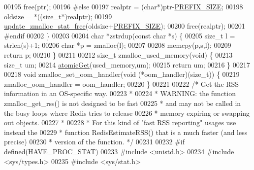 \begin{DoxyCode}
{00195     free(ptr);
00196 \textcolor{preprocessor}{#}\textcolor{preprocessor}{else}
00197     realptr = (\textcolor{keywordtype}{char}*)ptr-\hyperlink{zmalloc_8c_abe208177340b58cb5096daabe07922d1}{PREFIX\_SIZE};
00198     oldsize = *((size\_t*)realptr);
00199     \hyperlink{zmalloc_8c_a9be7d44298f111e7d7f69abb0b41f391}{update\_zmalloc\_stat\_free}(oldsize+\hyperlink{zmalloc_8c_abe208177340b58cb5096daabe07922d1}{PREFIX\_SIZE});
00200     free(realptr);
00201 \textcolor{preprocessor}{#}\textcolor{preprocessor}{endif}
00202 \}
00203 
00204 \textcolor{keywordtype}{char} *zstrdup(\textcolor{keyword}{const} \textcolor{keywordtype}{char} *s) \{
00205     size\_t l = strlen(s)+1;
00206     \textcolor{keywordtype}{char} *p = zmalloc(l);
00207 
00208     memcpy(p,s,l);
00209     \textcolor{keywordflow}{return} p;
00210 \}
00211 
00212 size\_t zmalloc\_used\_memory(\textcolor{keywordtype}{void}) \{
00213     size\_t um;
00214     \hyperlink{atomicvar_8h_a57b17e058ecff6871debb3d1d4f3031a}{atomicGet}(used\_memory,um);
00215     \textcolor{keywordflow}{return} um;
00216 \}
00217 
00218 \textcolor{keywordtype}{void} zmalloc\_set\_oom\_handler(\textcolor{keywordtype}{void} (*oom\_handler)(size\_t)) \{
00219     zmalloc\_oom\_handler = oom\_handler;
00220 \}
00221 
00222 \textcolor{comment}{/* Get the RSS information in an OS-specific way.}
00223 \textcolor{comment}{ *}
00224 \textcolor{comment}{ * WARNING: the function zmalloc\_get\_rss() is not designed to be fast}
00225 \textcolor{comment}{ * and may not be called in the busy loops where Redis tries to release}
00226 \textcolor{comment}{ * memory expiring or swapping out objects.}
00227 \textcolor{comment}{ *}
00228 \textcolor{comment}{ * For this kind of "fast RSS reporting" usages use instead the}
00229 \textcolor{comment}{ * function RedisEstimateRSS() that is a much faster (and less precise)}
00230 \textcolor{comment}{ * version of the function. */}
00231 
00232 \textcolor{preprocessor}{#}\textcolor{preprocessor}{if} \textcolor{preprocessor}{defined}\textcolor{preprocessor}{(}HAVE\_PROC\_STAT\textcolor{preprocessor}{)}
00233 \textcolor{preprocessor}{#}\textcolor{preprocessor}{include} \textcolor{preprocessor}{<}\textcolor{preprocessor}{unistd}\textcolor{preprocessor}{.}\textcolor{preprocessor}{h}\textcolor{preprocessor}{>}
00234 \textcolor{preprocessor}{#}\textcolor{preprocessor}{include} \textcolor{preprocessor}{<}\textcolor{preprocessor}{sys}\textcolor{preprocessor}{/}\textcolor{preprocessor}{types}\textcolor{preprocessor}{.}\textcolor{preprocessor}{h}\textcolor{preprocessor}{>}
00235 \textcolor{preprocessor}{#}\textcolor{preprocessor}{include} \textcolor{preprocessor}{<}\textcolor{preprocessor}{sys}\textcolor{preprocessor}{/}\textcolor{preprocessor}{stat}\textcolor{preprocessor}{.}\textcolor{preprocessor}{h}\textcolor{preprocessor}{>}
}
\end{DoxyCode}
